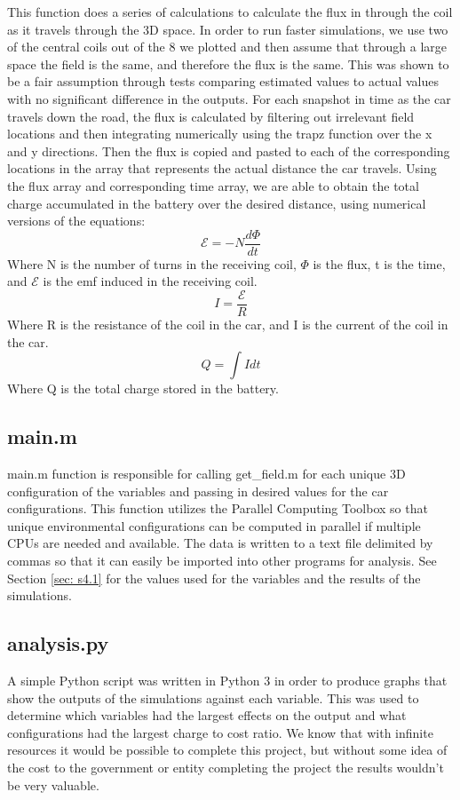 This function does a series of calculations to calculate the flux in through the coil as it travels through the 3D 
space. In order to run faster simulations, we use two of the central coils out of the 8 we plotted and then assume 
that through a large space the field is the same, and therefore the flux is the same. This was shown to be a fair 
assumption through tests comparing estimated values to actual values with no significant difference in the outputs. 
For each snapshot in time as the car travels down the road, the flux is calculated by filtering out irrelevant 
field locations and then integrating numerically using the trapz function over the x and y directions. 
Then the flux is copied and pasted to each of the corresponding locations in the array that represents the actual 
distance the car travels.  Using the flux array and corresponding time array, we are able to obtain the total 
charge accumulated in the battery over the desired distance, using numerical versions of the equations:
\begin{equation}
    \mathcal{E} = -N \frac{d\Phi}{dt}
\end{equation}
Where N is the number of turns in the receiving coil, $\Phi$ is the flux, t is the time, and $\mathcal{E}$ 
is the emf induced in the receiving coil. 
\begin{equation}
    I = \frac{\mathcal{E}}{R}
\end{equation}
Where R is the resistance of the coil in the car, and I is the current of the coil in the car.
\begin{equation}
    Q = \int{I dt}
\end{equation}
Where Q is the total charge stored in the battery. 

\subsection{main.m}
main.m function is responsible for calling get\_field.m for each unique 3D configuration of the variables and 
passing in desired values for the car configurations. This function utilizes the Parallel Computing Toolbox 
so that unique environmental configurations can be computed in parallel if multiple CPUs are needed and available. 
The data is written to a text file delimited by commas so that it can easily be imported into other programs for 
analysis. See Section \ref{sec: s4.1} for the values used for the variables and the results of the simulations.

\subsection{analysis.py}
A simple Python script was written in Python 3 in order to produce graphs that show the outputs of the simulations 
against each variable. This was used to determine which variables had the largest effects on the output and what 
configurations had the largest charge to cost ratio.  We know that with infinite resources it would be possible 
to complete this project, but without some idea of the cost to the government or entity completing the project 
the results wouldn’t be very valuable. 

